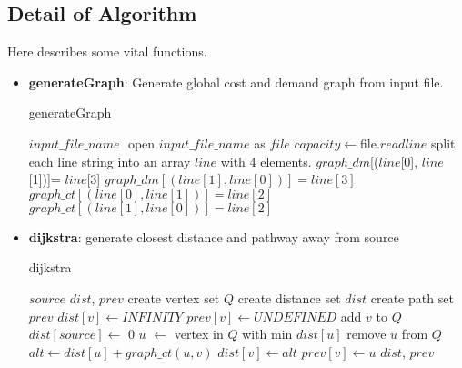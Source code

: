 \documentclass[conference,compsoc]{IEEEtran}
\renewcommand{\algorithmicrequire}{\textbf{Input:}}
\renewcommand{\algorithmicensure}{\textbf{Output:}}
\begin{document}
\subsection{Detail of Algorithm}
Here describes some vital functions.
\begin{itemize}
    \item \textbf{generateGraph}: Generate global cost and demand graph from
    input file.
    \begin{algorithm}[H]
     \caption{generateGraph}
     \begin{algorithmic}[1]
     \renewcommand{\algorithmicrequire}{\textbf{Input:}}
     \renewcommand{\algorithmicensure}{\textbf{Output:}}
     \REQUIRE $input\_file\_name$
     \ENSURE $ $
     \STATE open $input\_file\_name$ as $file$ 
     \STATE $capacity \leftarrow $file$.readline$
     \STATE {}
       \STATE split each line string into an array $line$ with 4 elements.
          \STATE $graph\_dm$[($line$[0], $line$[1])]= $line$[3]
          \STATE $graph\_dm[(line[1], line[0])]= line[3]$
       \ENDIF
       \STATE $graph\_ct[(line[0], line[1])]= line[2]$
       \STATE $graph\_ct[(line[1], line[0])]= line[2]$
     \ENDFOR
     \end{algorithmic}
   \end{algorithm}

   \item \textbf{dijkstra}: generate closest distance and pathway away from source
     \begin{algorithm}[H]
     \caption{dijkstra}
     \begin{algorithmic}[2]
     \renewcommand{\algorithmicrequire}{\textbf{Input:}}
     \renewcommand{\algorithmicensure}{\textbf{Output:}}
     \REQUIRE $source$
     \ENSURE  $dist$, $prev$
     \STATE create vertex set $Q$
     \STATE create distance set $dist$
     \STATE create path set $prev$
        \STATE $dist[v] \leftarrow INFINITY$
        \STATE $prev[v] \leftarrow UNDEFINED$
        \STATE add $v$ to $Q$
     \ENDFOR
     \STATE $dist[source] \leftarrow$ 0
        \STATE $u$ $\leftarrow$ vertex in $Q$ with min $dist[u]$
        \STATE remove $u$ from $Q$
           \STATE $alt \leftarrow dist[u] + graph\_ct(u,v)$
              \STATE $dist[v] \leftarrow alt$
              \STATE $prev[v] \leftarrow u$
           \ENDIF
        \ENDFOR
     \ENDWHILE
     \RETURN $dist$, $prev$
     \end{algorithmic}
     \end{algorithm}


\end{itemize}
\end{document}
